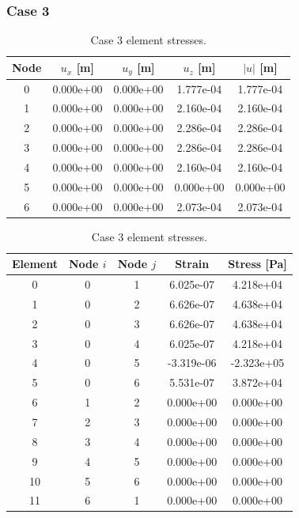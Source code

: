 \documentclass{article}
\begin{document}
\subsubsection*{Case 3}
\begin{table}[htbp]
\centering
\scriptsize
\begin{minipage}[t]{0.48\textwidth}
\centering
\caption{Case 3 nodal displacements.}
\begin{tabular}{c c c c c}
\toprule
Node & $u_x$ [m] & $u_y$ [m] & $u_z$ [m] & $|u|$ [m] \\
\midrule
0 & 0.000e+00 & 0.000e+00 & 1.777e-04 & 1.777e-04 \\
1 & 0.000e+00 & 0.000e+00 & 2.160e-04 & 2.160e-04 \\
2 & 0.000e+00 & 0.000e+00 & 2.286e-04 & 2.286e-04 \\
3 & 0.000e+00 & 0.000e+00 & 2.286e-04 & 2.286e-04 \\
4 & 0.000e+00 & 0.000e+00 & 2.160e-04 & 2.160e-04 \\
5 & 0.000e+00 & 0.000e+00 & 0.000e+00 & 0.000e+00 \\
6 & 0.000e+00 & 0.000e+00 & 2.073e-04 & 2.073e-04 \\
\bottomrule
\end{tabular}
\end{minipage}\hfill
\begin{minipage}[t]{0.48\textwidth}
\centering
\caption{Case 3 element stresses.}
\begin{tabular}{c c c c c}
\toprule
Element & Node $i$ & Node $j$ & Strain & Stress [Pa] \\
\midrule
0 & 0 & 1 & 6.025e-07 & 4.218e+04 \\
1 & 0 & 2 & 6.626e-07 & 4.638e+04 \\
2 & 0 & 3 & 6.626e-07 & 4.638e+04 \\
3 & 0 & 4 & 6.025e-07 & 4.218e+04 \\
4 & 0 & 5 & -3.319e-06 & -2.323e+05 \\
5 & 0 & 6 & 5.531e-07 & 3.872e+04 \\
6 & 1 & 2 & 0.000e+00 & 0.000e+00 \\
7 & 2 & 3 & 0.000e+00 & 0.000e+00 \\
8 & 3 & 4 & 0.000e+00 & 0.000e+00 \\
9 & 4 & 5 & 0.000e+00 & 0.000e+00 \\
10 & 5 & 6 & 0.000e+00 & 0.000e+00 \\
11 & 6 & 1 & 0.000e+00 & 0.000e+00 \\
\bottomrule
\end{tabular}
\end{minipage}
\end{table}
\end{document}
